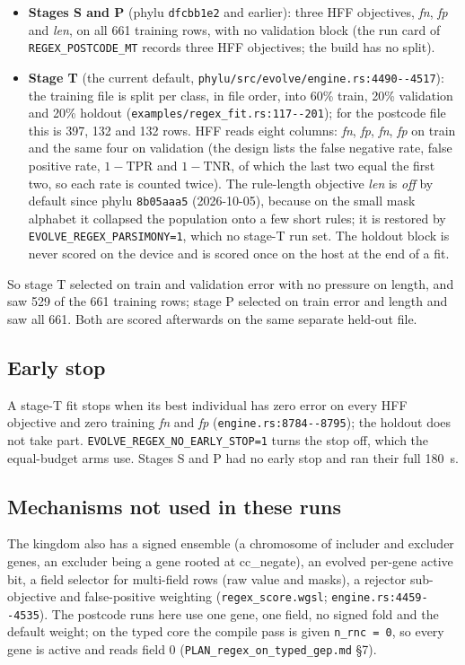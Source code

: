 \documentclass[sigconf,nonacm]{acmart}
\newcommand{\sym}[1]{\textsf{#1}}
\newcommand{\src}[1]{{\small\nolinkurl{#1}}}
\begin{document}
\begin{itemize}
\item \textbf{Stages S and P} (phylu \texttt{dfcbb1e2} and earlier): three HFF
objectives, \textit{fn}, \textit{fp} and \textit{len}, on all 661 training rows,
with no validation block (the run card of \src{REGEX_POSTCODE_MT} records
three HFF objectives; the build has no split).
\item \textbf{Stage T} (the current default,
\src{phylu/src/evolve/engine.rs:4490--4517}): the training file is split per
class, in file order, into 60\% train, 20\% validation and 20\% holdout
(\src{examples/regex_fit.rs:117--201}); for the postcode file this is 397, 132
and 132 rows. HFF reads eight columns: \textit{fn}, \textit{fp}, \textit{fn},
\textit{fp} on train and the same four on validation (the design lists the false
negative rate, false positive rate, $1-\mathrm{TPR}$ and $1-\mathrm{TNR}$, of which
the last two equal the first two, so each rate is counted twice). The rule-length
objective \textit{len} is \emph{off} by default since phylu \texttt{8b05aaa5}
(2026-10-05), because on the small mask alphabet it collapsed the population onto
a few short rules; it is restored by \src{EVOLVE_REGEX_PARSIMONY=1}, which no
stage-T run set. The holdout block is never scored on the device and is scored
once on the host at the end of a fit.
\end{itemize}

So stage T selected on train and validation error with no pressure on length,
and saw 529 of the 661 training rows; stage P selected on train error and length
and saw all 661. Both are scored afterwards on the same separate held-out file.

\subsection{Early stop}

A stage-T fit stops when its best individual has zero error on every HFF objective
and zero training \textit{fn} and \textit{fp} (\src{engine.rs:8784--8795}); the
holdout does not take part. \src{EVOLVE_REGEX_NO_EARLY_STOP=1} turns the
stop off, which the equal-budget arms use. Stages S and P had no early stop and
ran their full 180~s.

\subsection{Mechanisms not used in these runs}

The kingdom also has a signed ensemble (a chromosome of includer and excluder
genes, an excluder being a gene rooted at \sym{cc\_negate}), an evolved
per-gene active bit, a field selector for multi-field rows (raw value and masks),
a rejector sub-objective and false-positive weighting
(\src{regex_score.wgsl}; \src{engine.rs:4459--4535}). The postcode runs here use
one gene, one field, no signed fold and the default weight; on the typed core the
compile pass is given \texttt{n\_rnc = 0}, so every gene is active and reads field
0 (\src{PLAN_regex_on_typed_gep.md} \S7).
\end{document}
